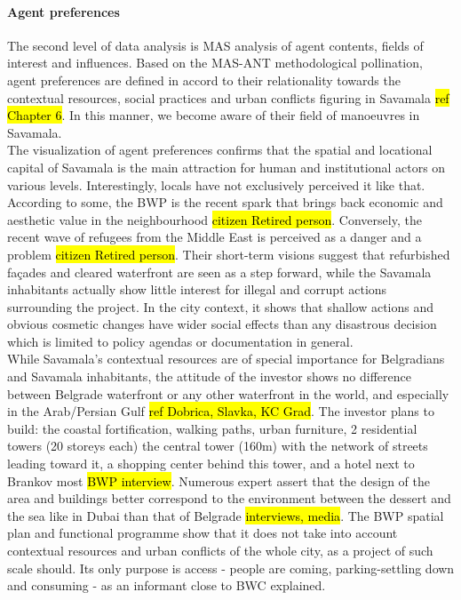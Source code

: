 \documentclass[11pt]{report}
\begin{document}
\paragraph{Agent preferences}
The second level of data analysis is MAS analysis of agent contents, fields of interest and influences.
Based on the MAS-ANT methodological pollination, agent preferences are defined in accord to their relationality towards the contextual resources, social practices and urban conflicts figuring in Savamala \hl{ref Chapter 6}. In this manner, we become aware of their field of manoeuvres in Savamala. 
\\
The visualization of agent preferences confirms that the spatial and locational capital of Savamala is the main attraction for human and institutional actors on various levels. %
Interestingly, locals have not exclusively perceived it like that. According to some, the BWP is the recent spark that brings back economic and aesthetic value in the neighbourhood \hl{citizen Retired person}.
Conversely, the recent wave of refugees from the Middle East is perceived as a danger and a problem \hl{citizen Retired person}. Their short-term visions suggest that refurbished façades and cleared waterfront are seen as a step forward, while the Savamala inhabitants actually show little interest for illegal and corrupt actions surrounding the project. In the city context, it shows that shallow actions and obvious cosmetic changes have wider social effects than any disastrous decision which is limited to policy agendas or documentation in general.
\\
While Savamala's contextual resources are of special importance for Belgradians and Savamala inhabitants, the attitude of the investor shows no difference between Belgrade waterfront or any other waterfront in the world, and especially in the Arab/Persian Gulf \hl{ref Dobrica, Slavka, KC Grad}. The investor plans to build: the coastal fortification, walking paths, urban furniture, 2 residential towers (20 storeys each) the central tower (160m) with the network of streets leading toward it, a shopping center behind this tower, and a hotel next to Brankov most \hl{BWP interview}. Numerous expert assert that the design of the area and buildings better correspond to the environment between the dessert and the sea like in Dubai than that of Belgrade \hl{interviews, media}.
The BWP spatial plan and functional programme show that it does not take into account contextual resources and urban conflicts of the whole city, as  a project of such scale should.
Its only purpose is access - people are coming, parking-settling down and consuming - as an informant close to BWC explained.
\end{document}
